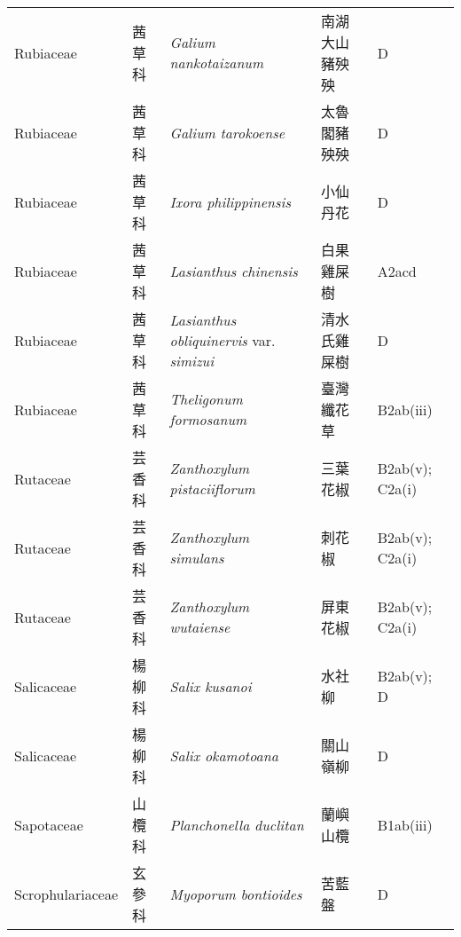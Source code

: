 {\begin{longtable}{p{2.5cm}p{2.5cm}p{4.5cm}p{2.5cm}p{3cm}}
    Rubiaceae & 茜草科 & \textit{Galium nankotaizanum}  & 南湖大山豬殃殃 & D \index{Galium@\textit{Galium}!nankotaizanum@\textit{nankotaizanum}}  \index{南湖大山豬殃殃} \\
    Rubiaceae & 茜草科 & \textit{Galium tarokoense}  & 太魯閣豬殃殃 & D \index{Galium@\textit{Galium}!tarokoense@\textit{tarokoense}}  \index{太魯閣豬殃殃} \\
    Rubiaceae & 茜草科 & \textit{Ixora philippinensis}  & 小仙丹花 & D \index{Ixora@\textit{Ixora}!philippinensis@\textit{philippinensis}}  \index{小仙丹花} \\
    Rubiaceae & 茜草科 & \textit{Lasianthus chinensis}  & 白果雞屎樹 & A2acd \index{Lasianthus@\textit{Lasianthus}!chinensis@\textit{chinensis}}  \index{白果雞屎樹} \\
    Rubiaceae & 茜草科 & \textit{Lasianthus obliquinervis} var. \textit{simizui}  & 清水氏雞屎樹 & D \index{Lasianthus@\textit{Lasianthus}!obliquinervis@\textit{obliquinervis}!var. simizui@var. \textit{simizui}}  \index{清水氏雞屎樹} \\
    Rubiaceae & 茜草科 & \textit{Theligonum formosanum}  & 臺灣纖花草 & B2ab(iii) \index{Theligonum@\textit{Theligonum}!formosanum@\textit{formosanum}}  \index{臺灣纖花草} \\
    Rutaceae & 芸香科 & \textit{Zanthoxylum pistaciiflorum}  & 三葉花椒 & B2ab(v); C2a(i) \index{Zanthoxylum@\textit{Zanthoxylum}!pistaciiflorum@\textit{pistaciiflorum}}  \index{三葉花椒} \\
    Rutaceae & 芸香科 & \textit{Zanthoxylum simulans}  & 刺花椒 & B2ab(v); C2a(i) \index{Zanthoxylum@\textit{Zanthoxylum}!simulans@\textit{simulans}}  \index{刺花椒} \\
    Rutaceae & 芸香科 & \textit{Zanthoxylum wutaiense}  & 屏東花椒 & B2ab(v); C2a(i) \index{Zanthoxylum@\textit{Zanthoxylum}!wutaiense@\textit{wutaiense}}  \index{屏東花椒} \\
    Salicaceae & 楊柳科 & \textit{Salix kusanoi}  & 水社柳 & B2ab(v); D \index{Salix@\textit{Salix}!kusanoi@\textit{kusanoi}}  \index{水社柳} \\
    Salicaceae & 楊柳科 & \textit{Salix okamotoana}  & 關山嶺柳 & D \index{Salix@\textit{Salix}!okamotoana@\textit{okamotoana}}  \index{關山嶺柳} \\
    Sapotaceae & 山欖科 & \textit{Planchonella duclitan}  & 蘭嶼山欖 & B1ab(iii) \index{Planchonella@\textit{Planchonella}!duclitan@\textit{duclitan}}  \index{蘭嶼山欖} \\
    Scrophulariaceae & 玄參科 & \textit{Myoporum bontioides}  & 苦藍盤 & D \index{Myoporum@\textit{Myoporum}!bontioides@\textit{bontioides}}  \index{苦藍盤} \\

\end{longtable}}
